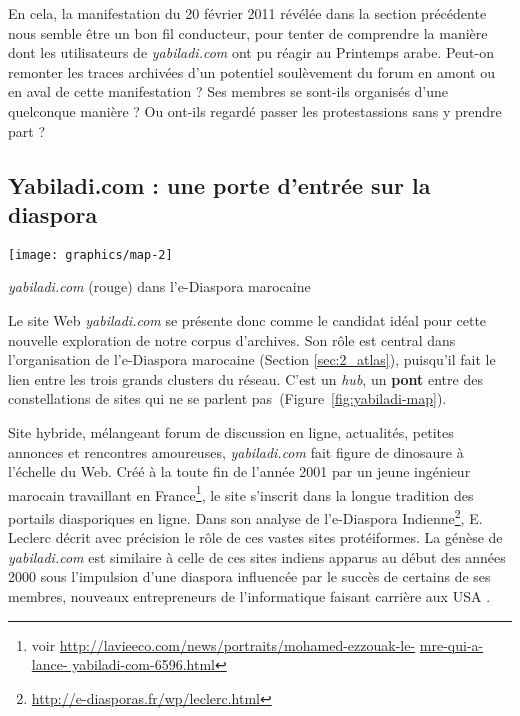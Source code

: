 \documentclass[symmetric,justified,marginals=raggedouter]{tufte-book}
\begin{document}
En cela, la manifestation du 20 février 2011 révélée dans la section précédente nous semble être un bon fil conducteur, pour tenter de comprendre la manière dont les utilisateurs de \textit{yabiladi.com} ont pu réagir au Printemps arabe. Peut-on remonter les traces archivées d'un potentiel soulèvement du forum en amont ou en aval de cette manifestation ? Ses membres se sont-ils organisés d'une quelconque manière ? Ou ont-ils regardé passer les protestassions sans y prendre part ? 

\subsection{Yabiladi.com : une porte d'entrée sur la diaspora}

\begin{marginfigure}%
  \texttt{[image: graphics/map-2]}
  \vspace*{0.2cm}  
  \caption{\textit{yabiladi.com} (rouge) dans l'e-Diaspora marocaine}
  \label{fig:yabiladi-map}
\end{marginfigure} 

\noindent Le site Web \textit{yabiladi.com} se présente donc comme le candidat idéal pour cette nouvelle exploration de notre corpus d'archives.  Son rôle est central dans l'organisation de l'e-Diaspora marocaine (Section \ref{sec:2_atlas}), puisqu'il fait le lien entre les trois grands clusters du réseau. C'est un \textit{hub}, un \textbf{pont} entre des constellations de sites qui ne se parlent pas~(Figure~\ref{fig:yabiladi-map}).

Site hybride, mélangeant forum de discussion en ligne, actualités, petites annonces et rencontres amoureuses, \textit{yabiladi.com} fait figure de dinosaure à l'échelle du Web. Créé à la toute fin de l'année 2001 par un jeune ingénieur marocain travaillant en France\footnote{\RaggedOuter voir \url{http://lavieeco.com/news/portraits/mohamed-ezzouak-le-} \url{mre-qui-a-lance-
yabiladi-com-6596.html}}, le site s'inscrit dans la longue tradition des portails diasporiques en ligne. Dans son analyse de l'e-Diaspora Indienne\footnote{\RaggedOuter \url{http://e-diasporas.fr/wp/leclerc.html}}, E. Leclerc décrit avec précision le rôle de ces vastes sites protéiformes. La génèse de \textit{yabiladi.com} est similaire à celle de ces sites indiens apparus au début des années 2000 sous l'impulsion d'une diaspora influencée par le succès de certains de ses membres, nouveaux entrepreneurs de l'informatique faisant carrière aux USA \citep{leclerc_cyberespace_2012}.\\
\end{document}
